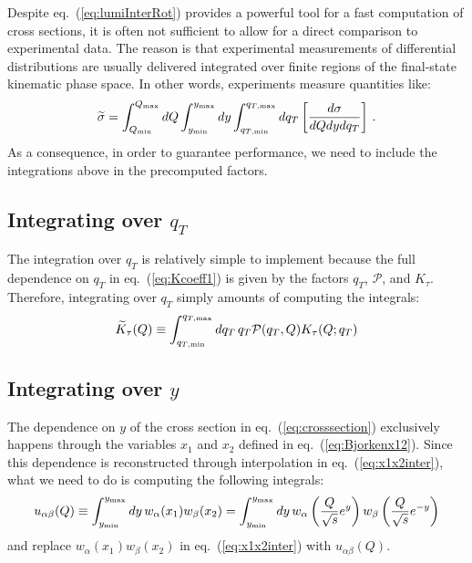 \documentclass[10pt,a4paper]{article}
\begin{document}
Despite eq.~(\ref{eq:lumiInterRot}) provides a powerful tool for a
fast computation of cross sections, it is often not sufficient to
allow for a direct comparison to experimental data. The reason is that
experimental measurements of differential distributions are usually
delivered integrated over finite regions of the final-state kinematic
phase space. In other words, experiments measure quantities like:
\begin{equation}\label{eq:Intcrosssection}
\widetilde{\sigma}=\int_{Q_{\rm min}}^{Q_{\rm max}}dQ \int_{y_{\rm min}}^{y_{\rm max}}dy \int_{q_{T,\rm min}}^{q_{T,\rm max}}dq_T\left[\frac{d\sigma}{dQ dy dq_T} \right]\,.
\end{equation}
As a consequence, in order to guarantee performance, we need to
include the integrations above in the precomputed factors.

\subsection{Integrating over $q_T$}

The integration over $q_T$ is relatively simple to implement because
the full dependence on $q_T$ in eq.~(\ref{eq:Kcoeff1}) is given by the
factors $q_T$, $\mathcal{P}$, and $K_\tau$. Therefore, integrating
over $q_T$ simply amounts of computing the integrals:
\begin{equation}\label{eq:KcoeffInt}
  \widetilde{K}_\tau(Q)\equiv \int_{q_{T,\rm min}}^{q_{T,\rm max}}dq_T\,q_T\mathcal{P}(q_T,Q) K_\tau(Q;q_T)
\end{equation}

\subsection{Integrating over $y$}

The dependence on $y$ of the cross section in
eq.~(\ref{eq:crosssection}) exclusively happens through the variables
$x_1$ and $x_2$ defined in eq.~(\ref{eq:Bjorkenx12}). Since this
dependence is reconstructed through interpolation in
eq.~(\ref{eq:x1x2inter}), what we need to do is computing the
following integrals:
\begin{equation}
u_{\alpha\beta}(Q)\equiv\int_{y_{\rm min}}^{y_{\rm max}}dy\,
w_\alpha(x_1)w_\beta(x_2) = \int_{y_{\rm min}}^{y_{\rm max}}dy\,w_\alpha\left(\frac{Q}{\sqrt{s}}e^y\right)w_\beta\left(\frac{Q}{\sqrt{s}}e^{-y}\right)
\end{equation}
and replace $w_\alpha(x_1)w_\beta(x_2)$ in eq.~(\ref{eq:x1x2inter})
with $u_{\alpha\beta}(Q)$.
\end{document}

